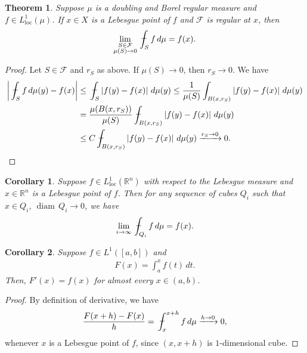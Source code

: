 \documentclass[11pt]{book}
\newtheorem{theorem}{Theorem}[chapter]
\newtheorem{corollary}{Corollary}[theorem]
\theoremstyle{definition}
\numberwithin{equation}{chapter}
\def\diam{{\operatorname{diam}\,}}
\def\avint{\,\ThisStyle{\ensurestackMath{%
  \stackinset{c}{.2\LMpt}{c}{1\LMpt}{\SavedStyle-}{\SavedStyle\phantom{\int}}}%
  \setbox0=\hbox{$\SavedStyle\int\,$}\kern-\wd0}\int}
\begin{document}
\medskip

\begin{theorem}
Suppose $\mu$ is a doubling and Borel regular measure and $f \in L^1_{\operatorname{loc}}(\mu)$. If $x \in X$ is a Lebesgue point of $f$ and $\mathcal{F}$ is regular at $x$, then 
\begin{align*}
    \lim_{\substack{S \in \mathcal{F}\\ \mu(S) \to 0}} \avint_S f\,d\mu = f(x).
\end{align*}
\end{theorem}
\begin{proof}
Let $S \in \mathcal{F}$ and $r_S$ as above. If $\mu(S) \to 0$, then $r_S \to 0$. We have
\begin{align*}
    \left|\avint_S f\,d\mu(y) - f(x)\right| & \leq \avint_S \left|f(y) - f(x)\right| \,d\mu(y) \leq \frac{1}{\mu(S)} \int_{B(x,r_S)} \left|f(y) - f(x)\right| \,d\mu(y) \\
    & = \frac{\mu(B(x,r_S))}{\mu(S)} \avint_{B(x,r_S)} \left|f(y) - f(x)\right| \,d\mu(y) \\
    & \leq C \avint_{B(x,r_S)} \left|f(y) - f(x)\right| \,d\mu(y) \xrightarrow[]{r_S \to 0} 0.
\end{align*}
\end{proof}

\medskip

\begin{corollary}
Suppose $f \in L^1_{\operatorname{loc}}(\mathbb{R}^n)$ with respect to the Lebesgue measure and $x \in \mathbb{R}^n$ is a Lebesgue point of $f$. Then for any sequence of cubes $Q_i$ such that $x \in Q_i$, $\diam Q_i \to 0$, we have
\begin{align*}
    \lim_{i \to \infty} \avint_{Q_i} f \,d\mu = f(x).
\end{align*}
\end{corollary}

\medskip

\begin{corollary}\label{coro_632}
Suppose $f \in L^1([a,b])$ and
\begin{align*}
    F(x) = \int^x_a f(t)\,dt.
\end{align*}
Then, $F'(x) = f(x)$ for almost every $x \in (a,b)$.
\end{corollary}
\begin{proof}
By definition of derivative, we have
\begin{align*}
    \frac{F(x + h) - F(x)}{h} = \avint^{x+h}_x f\,d\mu \xrightarrow[]{h \to 0} 0,
\end{align*}
whenever $x$ is a Lebesgue point of $f$, since $(x,x+h)$ is $1$-dimensional cube. 
\end{proof}
\end{document}
